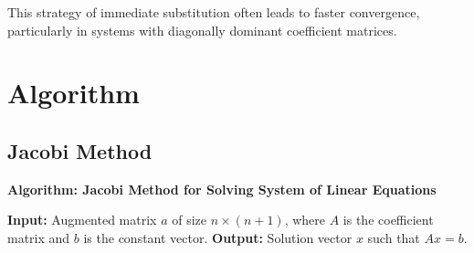 \documentclass[a4paper,12pt]{article}
\begin{document}
This strategy of immediate substitution often leads to faster convergence, particularly in systems with diagonally dominant coefficient matrices.

\section{Algorithm}

\subsection{Jacobi Method}

\textbf{Algorithm: Jacobi Method for Solving System of Linear Equations}

\textbf{Input:} Augmented matrix $a$ of size $n \times (n+1)$, where $A$ is the coefficient matrix and $b$ is the constant vector.  
\textbf{Output:} Solution vector $x$ such that $Ax = b$.
\end{document}
